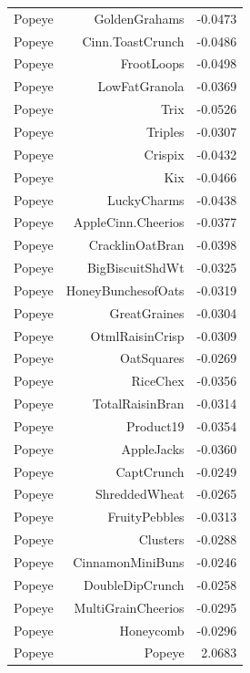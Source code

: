 \begin{longtable}{@{}lrr@{}}
Popeye & GoldenGrahams & -0.0473 \\
Popeye & Cinn.ToastCrunch & -0.0486 \\
Popeye & FrootLoops & -0.0498 \\
Popeye & LowFatGranola & -0.0369 \\
Popeye & Trix & -0.0526 \\
Popeye & Triples & -0.0307 \\
Popeye & Crispix & -0.0432 \\
Popeye & Kix & -0.0466 \\
Popeye & LuckyCharms & -0.0438 \\
Popeye & AppleCinn.Cheerios & -0.0377 \\
Popeye & CracklinOatBran & -0.0398 \\
Popeye & BigBiscuitShdWt & -0.0325 \\
Popeye & HoneyBunchesofOats & -0.0319 \\
Popeye & GreatGraines & -0.0304 \\
Popeye & OtmlRaisinCrisp & -0.0309 \\
Popeye & OatSquares & -0.0269 \\
Popeye & RiceChex & -0.0356 \\
Popeye & TotalRaisinBran & -0.0314 \\
Popeye & Product19 & -0.0354 \\
Popeye & AppleJacks & -0.0360 \\
Popeye & CaptCrunch & -0.0249 \\
Popeye & ShreddedWheat & -0.0265 \\
Popeye & FruityPebbles & -0.0313 \\
Popeye & Clusters & -0.0288 \\
Popeye & CinnamonMiniBuns & -0.0246 \\
Popeye & DoubleDipCrunch & -0.0258 \\
Popeye & MultiGrainCheerios & -0.0295 \\
Popeye & Honeycomb & -0.0296 \\
Popeye & Popeye & 2.0683 \\
\bottomrule
\end{longtable}
\endgroup
